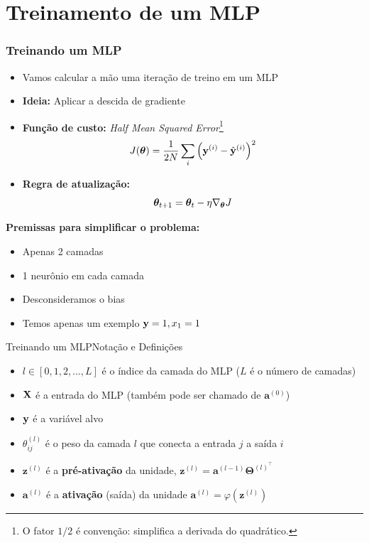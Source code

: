 \documentclass[aspectratio=169, xcolor=dvipsnames]{beamer}
\begin{document}
  \section{Treinamento de um MLP}
  \begin{frame}
    \frametitle{Treinando um MLP}
    \begin{itemize}
      \item Vamos calcular a mão uma iteração de treino em um MLP

      \item \textbf{Ideia:} Aplicar a descida de gradiente

      \item \textbf{Função de custo:} \textit{Half Mean Squared Error}\footnote{O fator $1/2$ é convenção: simplifica a derivada do quadrático.}
        \[
          J(\bm{\theta})=\frac{1}{2N}\sum_{i}\left(\mathbf{y}^{(i)}-\hat{\mathbf{y}}^{(i)}\right)^{2}
        \]

      \item \textbf{Regra de atualização:}
        \[
          \bm{\theta}_{t+1}=\bm{\theta}_{t}-\eta\nabla_{\bm{\theta}} J
        \]
    \end{itemize}
    \vfill
    \textbf{Premissas para simplificar o problema:}
    \begin{itemize}
      \item Apenas 2 camadas

      \item 1 neurônio em cada camada

      \item Desconsideramos o bias

      \item Temos apenas um exemplo $\mathbf{y}=1, x_{1}=1$
    \end{itemize}
  \end{frame}

  \begin{frame}{Treinando um MLP}{Notação e Definições}
    \begin{itemize}
      \item $l\in [0,1,2,...,L]$ é o índice da camada do MLP ($L$ é o número de camadas)

      \item $\mathbf{X}$ é a entrada do MLP (também pode ser chamado de $\mathbf{a}^{(0)}$)

      \item $\mathbf{y}$ é a variável alvo

      \item $\theta^{(l)}_{ij}$ é o peso da camada $l$ que conecta a entrada $j$
        a saída $i$

      \item $\mathbf{z}^{(l)}$ é a \textbf{\alert{pré-ativação}} da unidade, $\mathbf{z}^{(l)}=
        \mathbf{a}^{(l-1)}\mathbf{\Theta}^{(l)^\top}$

      \item $\mathbf{a}^{(l)}$ é a \textbf{\alert{ativação}} (saída) da unidade
        $\mathbf{a}^{(l)}=\varphi(\mathbf{z}^{(l)})$
    \end{itemize}
  \end{frame}
\end{document}
